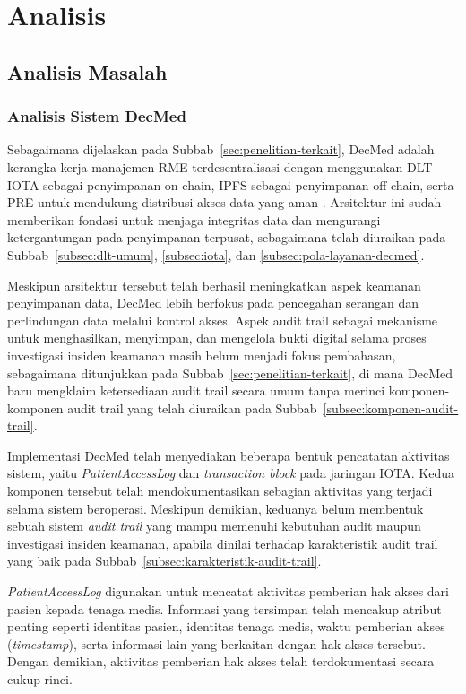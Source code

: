 \section{Analisis}

\subsection{Analisis Masalah}

\subsubsection{Analisis Sistem DecMed}

Sebagaimana dijelaskan pada Subbab~\ref{sec:penelitian-terkait}, DecMed adalah kerangka kerja manajemen RME terdesentralisasi dengan menggunakan DLT IOTA sebagai penyimpanan on-chain, IPFS sebagai penyimpanan off-chain, serta PRE untuk mendukung distribusi akses data yang aman \cite{DecMed}. Arsitektur ini sudah memberikan fondasi untuk menjaga integritas data dan mengurangi ketergantungan pada penyimpanan terpusat, sebagaimana telah diuraikan pada Subbab~\ref{subsec:dlt-umum}, \ref{subsec:iota}, dan \ref{subsec:pola-layanan-decmed}.

Meskipun arsitektur tersebut telah berhasil meningkatkan aspek keamanan penyimpanan data, DecMed lebih berfokus pada pencegahan serangan dan perlindungan data melalui kontrol akses. Aspek audit trail sebagai mekanisme untuk menghasilkan, menyimpan, dan mengelola bukti digital selama proses investigasi insiden keamanan masih belum menjadi fokus pembahasan, sebagaimana ditunjukkan pada Subbab~\ref{sec:penelitian-terkait}, di mana DecMed baru mengklaim ketersediaan audit trail secara umum tanpa merinci komponen-komponen audit trail yang telah diuraikan pada Subbab~\ref{subsec:komponen-audit-trail}.

Implementasi DecMed telah menyediakan beberapa bentuk pencatatan aktivitas sistem, yaitu \textit{PatientAccessLog} dan \textit{transaction block} pada jaringan IOTA. Kedua komponen tersebut telah mendokumentasikan sebagian aktivitas yang terjadi selama sistem beroperasi. Meskipun demikian, keduanya belum membentuk sebuah sistem \textit{audit trail} yang mampu memenuhi kebutuhan audit maupun investigasi insiden keamanan, apabila dinilai terhadap karakteristik audit trail yang baik pada Subbab~\ref{subsec:karakteristik-audit-trail}.

\textit{PatientAccessLog} digunakan untuk mencatat aktivitas pemberian hak akses dari pasien kepada tenaga medis. Informasi yang tersimpan telah mencakup atribut penting seperti identitas pasien, identitas tenaga medis, waktu pemberian akses (\textit{timestamp}), serta informasi lain yang berkaitan dengan hak akses tersebut. Dengan demikian, aktivitas pemberian hak akses telah terdokumentasi secara cukup rinci.

